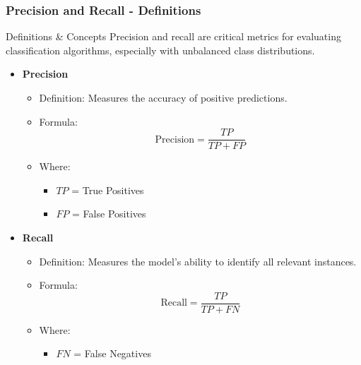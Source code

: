 \documentclass[aspectratio=169]{beamer}
\begin{document}
\begin{frame}[fragile]
    \frametitle{Precision and Recall - Definitions}
    \begin{block}{Definitions & Concepts}
        Precision and recall are critical metrics for evaluating classification algorithms, especially with unbalanced class distributions.
    \end{block}
    
    \begin{itemize}
        \item \textbf{Precision}
        \begin{itemize}
            \item Definition: Measures the accuracy of positive predictions.
            \item Formula: 
            \begin{equation}
                \text{Precision} = \frac{TP}{TP + FP}
            \end{equation}
            \item Where:
            \begin{itemize}
                \item \( TP \) = True Positives
                \item \( FP \) = False Positives
            \end{itemize}
        \end{itemize}
        
        \item \textbf{Recall}
        \begin{itemize}
            \item Definition: Measures the model's ability to identify all relevant instances.
            \item Formula:
            \begin{equation}
                \text{Recall} = \frac{TP}{TP + FN}
            \end{equation}
            \item Where:
            \begin{itemize}
                \item \( FN \) = False Negatives
            \end{itemize}
        \end{itemize}
    \end{itemize}
\end{frame}
\end{document}

